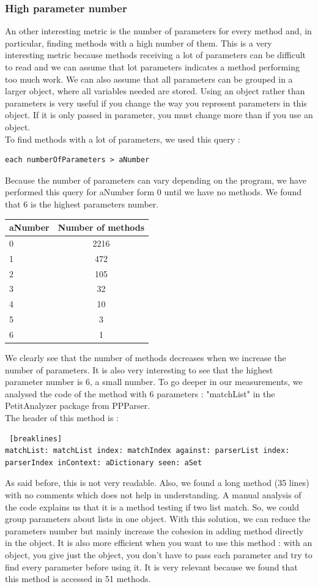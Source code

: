 \subsubsection{High parameter number}
An other interesting metric is the number of parameters for every method and, in particular, finding methods with a high number of them.  This is a very interesting metric because methods receiving a lot of parameters can be difficult to read and we can assume that lot parameters indicates a method performing too much work.  We can also assume that all parameters can be grouped in a larger object, where all variables needed are stored.  Using an object rather than parameters is very useful if you change the way you represent parameters in this object.  If it is only passed in parameter, you must change more than if you use an object.\\
To find methods with a lot of parameters, we used this query :
\begin{lstlisting}
each numberOfParameters > aNumber
\end{lstlisting}
Because the number of parameters can vary depending on the program, we have performed this query for aNumber form 0 until we have no methods.  We found that 6 is the highest parameters number. \\
\begin{center}
\begin{tabular}{|l|c|}
  \hline
  aNumber& Number of methods \\
  \hline
  0 & 2216 \\
  1 & 472 \\
  2 & 105 \\
  3 & 32 \\
  4 & 10 \\
  5 & 3 \\
  6 & 1 \\
  \hline
\end{tabular}
\end{center}
We clearly see that the number of methods decreases when we increase the number of parameters.  It is also very interesting to see that the highest parameter number is 6, a small number.  To go deeper in our measurements, we analysed the code of the method with 6 parameters :  "matchList" in the PetitAnalyzer package from PPParser.\\
The header of this method is :
\begin{lstlisting} [breaklines]
matchList: matchList index: matchIndex against: parserList index: parserIndex inContext: aDictionary seen: aSet
\end{lstlisting}
As said before, this is not very readable.  Also, we found a long method (35 lines) with no comments which does not help in understanding.  A manual analysis of the code explains us that it is a method testing if two list match.  So, we could group parameters about lists in one object.  With this solution, we can reduce the parameters number but mainly increase the cohesion in adding method directly in the object.  It is also more efficient when you want to use this method : with an object, you give just the object, you don't have to pass each parameter and try to find every parameter before using it. It is very relevant because we found that this method is accessed in 51 methods.
